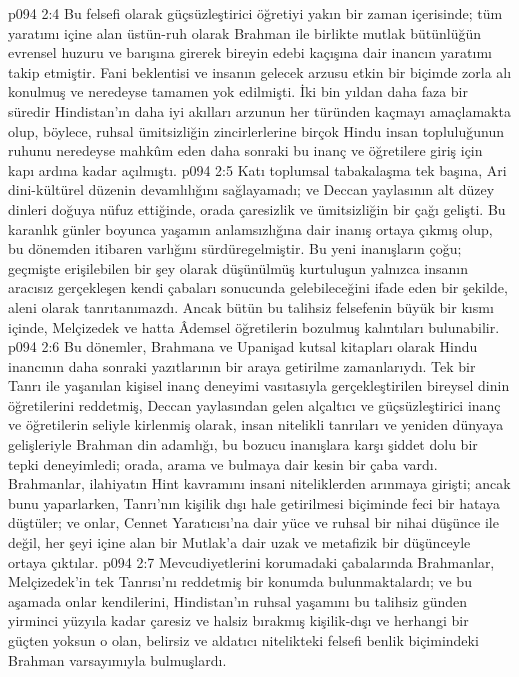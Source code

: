 \vs p094 2:4 Bu felsefi olarak güçsüzleştirici öğretiyi yakın bir zaman içerisinde; tüm yaratımı içine alan üstün\hyp{}ruh olarak Brahman ile birlikte mutlak bütünlüğün evrensel huzuru ve barışına girerek bireyin edebi kaçışına dair inancın yaratımı takip etmiştir. Fani beklentisi ve insanın gelecek arzusu etkin bir biçimde zorla alı konulmuş ve neredeyse tamamen yok edilmişti. İki bin yıldan daha faza bir süredir Hindistan’ın daha iyi akılları arzunun her türünden kaçmayı amaçlamakta olup, böylece, ruhsal ümitsizliğin zincirlerlerine birçok Hindu insan topluluğunun ruhunu neredeyse mahkûm eden daha sonraki bu inanç ve öğretilere giriş için kapı ardına kadar açılmıştı.
\vs p094 2:5 Katı toplumsal tabakalaşma tek başına, Ari dini\hyp{}kültürel düzenin devamlılığını sağlayamadı; ve Deccan yaylasının alt düzey dinleri doğuya nüfuz ettiğinde, orada çaresizlik ve ümitsizliğin bir çağı gelişti. Bu karanlık günler boyunca yaşamın anlamsızlığına dair inanış ortaya çıkmış olup, bu dönemden itibaren varlığını sürdüregelmiştir. Bu yeni inanışların çoğu; geçmişte erişilebilen bir şey olarak düşünülmüş kurtuluşun yalnızca insanın aracısız gerçekleşen kendi çabaları sonucunda gelebileceğini ifade eden bir şekilde, aleni olarak tanrıtanımazdı. Ancak bütün bu talihsiz felsefenin büyük bir kısmı içinde, Melçizedek ve hatta Âdemsel öğretilerin bozulmuş kalıntıları bulunabilir.
\vs p094 2:6 Bu dönemler, Brahmana ve Upanişad kutsal kitapları olarak Hindu inancının daha sonraki yazıtlarının bir araya getirilme zamanlarıydı. Tek bir Tanrı ile yaşanılan kişisel inanç deneyimi vasıtasıyla gerçekleştirilen bireysel dinin öğretilerini reddetmiş, Deccan yaylasından gelen alçaltıcı ve güçsüzleştirici inanç ve öğretilerin seliyle kirlenmiş olarak, insan nitelikli tanrıları ve yeniden dünyaya gelişleriyle Brahman din adamlığı, bu bozucu inanışlara karşı şiddet dolu bir tepki deneyimledi; orada,  arama ve bulmaya dair kesin bir çaba vardı. Brahmanlar, ilahiyatın Hint kavramını insani niteliklerden arınmaya girişti; ancak bunu yaparlarken, Tanrı’nın kişilik dışı hale getirilmesi biçiminde feci bir hataya düştüler; ve onlar, Cennet Yaratıcısı’na dair yüce ve ruhsal bir nihai düşünce ile değil, her şeyi içine alan bir Mutlak’a dair uzak ve metafizik bir düşünceyle ortaya çıktılar.
\vs p094 2:7 Mevcudiyetlerini korumadaki çabalarında Brahmanlar, Melçizedek’in tek Tanrısı’nı reddetmiş bir konumda bulunmaktalardı; ve bu aşamada onlar kendilerini, Hindistan’ın ruhsal yaşamını bu talihsiz günden yirminci yüzyıla kadar çaresiz ve halsiz bırakmış kişilik\hyp{}dışı ve herhangi bir güçten yoksun  o olan, belirsiz ve aldatıcı nitelikteki felsefi benlik biçimindeki Brahman varsayımıyla bulmuşlardı.
